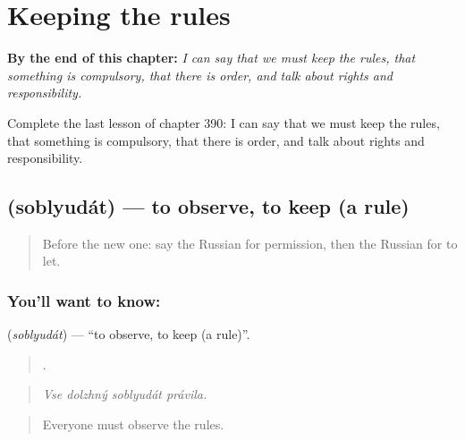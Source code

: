 
\chapter{Keeping the rules}
\label{ch:ru-keeping-the-rules}

\begin{chapteropening}
\textbf{By the end of this chapter:} \emph{I can say that we must keep the rules, that something is compulsory, that there is order, and talk about rights and responsibility.}

Complete the last lesson of chapter 390: I can say that we must keep the rules, that something is compulsory, that there is order, and talk about rights and responsibility.
\end{chapteropening}

\section[\texorpdfstring{\ru{соблюдать} (soblyudát)}{соблюдать (soblyudát)}]{ (soblyudát) — to observe, to keep (a rule)}

\label{lesson:RU-C390-soblyudat}



\begin{quote}
Before the new one: say the Russian for permission, then the Russian for to let.
\end{quote}

\subsection*{You'll want to know: }
\textbf{} (\emph{soblyudát}) — \textquotedblleft{}to observe, to keep (a rule)\textquotedblright{}.

\begin{quote}
   .
\end{quote}

\begin{quote}
\emph{Vse dolzhný soblyudát právila.}
\end{quote}

\begin{quote}
Everyone must observe the rules.
\end{quote}

